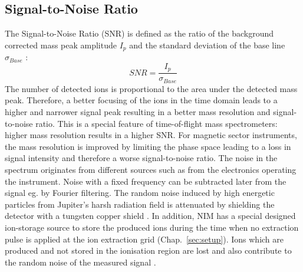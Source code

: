 	\subsection{Signal-to-Noise Ratio}
	The Signal-to-Noise Ratio (SNR) is defined as the ratio of the background corrected mass peak amplitude $I_{p}$ and the standard deviation of the base line $\sigma_{Base}$ \cite{Agilent_TechNote_SNR,Master_Meyer}: %
	\begin{equation}
		SNR = \frac{I_{p}}{\sigma_{Base}}
		\label{eq:SNR}
	\end{equation}
	The number of detected ions is proportional to the area under the detected mass peak. Therefore, a better focusing of the ions in the time domain leads to a higher and narrower signal peak resulting in a better mass resolution and signal-to-noise ratio. This is a special feature of time-of-flight mass spectrometers: higher mass resolution results in a higher SNR. For magnetic sector instruments, the mass resolution is improved by limiting the phase space leading to a loss in signal intensity and therefore a worse signal-to-noise ratio. The noise in the spectrum originates from different sources such as from the electronics operating the instrument. Noise with a fixed frequency can be subtracted later from the signal eg. by Fourier filtering. The random noise induced by high energetic particles from Jupiter's harsh radiation field is attenuated by shielding the detector with a tungsten copper shield \cite{Foehn2021}. In addition, NIM has a special designed ion-storage source to store the produced ions during the time when no extraction pulse is applied at the ion extraction grid (Chap.~\ref{sec:setup}). Ions which are produced and not stored in the ionisation region are lost and also contribute to the random noise of the measured signal \cite{Diss_Abplanalp}. 


